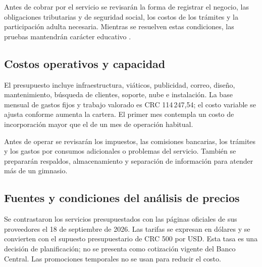 Antes de cobrar por el servicio se revisarán la forma de registrar el negocio,
las obligaciones tributarias y de seguridad social, los costos de los trámites
y la participación adulta necesaria. Mientras se resuelven estas condiciones,
las pruebas mantendrán carácter educativo
\parencite{codigo_comercio_cr,hacienda_rut,ccss_independiente}.

\subsection{Costos operativos y capacidad}

El presupuesto incluye infraestructura, viáticos, publicidad, correo, diseño,
mantenimiento, búsqueda de clientes, soporte, nube e instalación. La
base mensual de gastos fijos y trabajo valorado es CRC 114\,247,54; el costo
variable se ajusta conforme aumenta la cartera. El primer mes contempla un costo
de incorporación mayor que el de un mes de operación habitual.

Antes de operar se revisarán los impuestos, las comisiones bancarias, los
trámites y los gastos por consumos adicionales o problemas del servicio.
También se prepararán respaldos, almacenamiento y separación de información
para atender más de un gimnasio.

\subsection{Fuentes y condiciones del análisis de precios}
\label{sec:fuentes-precios}

Se contrastaron los servicios presupuestados con las páginas oficiales de sus
proveedores el 18 de septiembre de 2026. Las tarifas se expresan en dólares y
se convierten con el supuesto presupuestario de CRC 500 por USD. Esta tasa es
una decisión de planificación; no se presenta como cotización vigente del
Banco Central. Las promociones temporales no se usan para reducir el costo.

